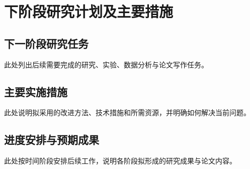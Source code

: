\chapter{下阶段研究计划及主要措施}

\section{下一阶段研究任务}
此处列出后续需要完成的研究、实验、数据分析与论文写作任务。

\section{主要实施措施}
此处说明拟采用的改进方法、技术措施和所需资源，并明确如何解决当前问题。

\section{进度安排与预期成果}
此处按时间阶段安排后续工作，说明各阶段拟形成的研究成果与论文内容。
